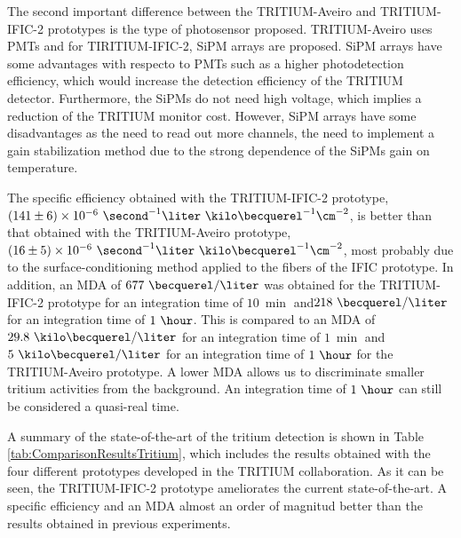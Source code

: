 \begin{enumerate}
The second important difference between the TRITIUM-Aveiro and TRITIUM-IFIC-2 prototypes is the type of photosensor proposed. TRITIUM-Aveiro uses PMTs and for TIRITIUM-IFIC-2, SiPM arrays are proposed. SiPM arrays have some advantages with respecto to PMTs such as a higher photodetection efficiency, which would increase the detection efficiency of the TRITIUM detector. Furthermore, the SiPMs do not need high voltage, which implies a reduction of the TRITIUM monitor cost. However, SiPM arrays have some disadvantages as the need to read out more channels, the need to implement a gain stabilization method due to the strong dependence of the SiPMs gain on temperature.

The specific efficiency obtained with the TRITIUM-IFIC-2 prototype, $(141 \pm 6) \times 10^{-6}~ \second^{-1}  \liter ~ \kilo\becquerel^{-1} \cm^{-2}$, is better than that obtained with the TRITIUM-Aveiro prototype, $(16 \pm 5)\times 10^{-6}~ \second^{-1}  \liter ~ \kilo\becquerel^{-1} \cm^{-2}$, most probably due to the surface-conditioning method applied to the fibers of the IFIC prototype. In addition, an MDA of $677~\becquerel/\liter$ was obtained for the TRITIUM-IFIC-2 prototype for an integration time of $10~\min$ and$218~\becquerel/\liter$ for an integration time of $1~\hour$. This is compared to an MDA of $29.8~\kilo\becquerel/\liter$ for an integration time of $1~\min$ and $5~\kilo\becquerel/\liter$ for an integration time of $1~\hour$ for the TRITIUM-Aveiro prototype. A lower MDA allows us to discriminate smaller tritium activities from the background. An integration time of $1~\hour$ can still be considered a quasi-real time.

A summary of the state-of-the-art of the tritium detection is shown in Table \ref{tab:ComparisonResultsTritium}, which includes the results obtained with the four different prototypes developed in the TRITIUM collaboration. As it can be seen, the TRITIUM-IFIC-2 prototype ameliorates the current state-of-the-art. A specific efficiency and an MDA almost an order of magnitud better than the results obtained in previous experiments.


\end{enumerate}
